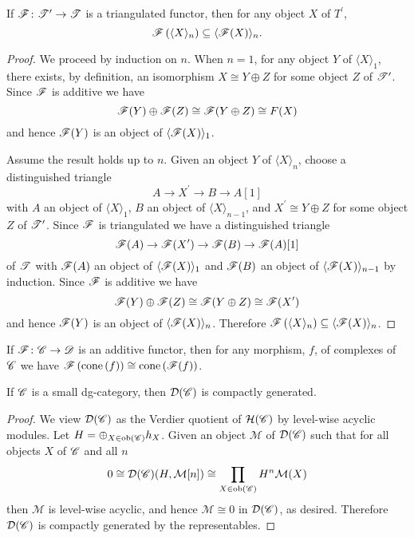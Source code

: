 \documentclass[dissertation.tex]{subfiles}
\begin{document}
\begin{lem}\label{TriangulatedFunctorsPreserveGens}
  If $\mathscr{F} \colon \mathscr{T}^\prime \to \mathscr{T}$ is a triangulated functor, then for any object $X$ of $T^\prime$, 
  $$\mathscr{F}\left(\langle X \rangle_n\right) \subseteq \langle \mathscr{F}(X) \rangle_n.$$

  \begin{proof}
    We proceed by induction on $n$.
    When $n = 1$, for any object $Y$ of $\langle X \rangle_1$, there exists, by definition, an isomorphism $X \cong Y \oplus Z$ for some object $Z$ of $\mathscr{T}^\prime$.
    Since $\mathscr{F}$ is additive we have
    $$\mathscr{F}(Y) \oplus \mathscr{F}(Z) \cong \mathscr{F}(Y \oplus Z) \cong F(X)$$
    and hence $\mathscr{F}(Y)$ is an object of $\langle \mathscr{F}(X) \rangle_1$.

    Assume the result holds up to $n$.
    Given an object $Y$ of $\langle X \rangle_n$, choose a distinguished triangle
    $$A \to X^\prime \to B \to A[1]$$
    with $A$ an object of $\langle X \rangle_1$, $B$ an object of $\langle X \rangle_{n-1}$, and $X^\prime \cong Y \oplus Z$ for some object $Z$ of $\mathscr{T}^\prime$.
    Since $\mathscr{F}$ is triangulated we have a distinguished triangle
    $$\mathscr{F}(A) \to \mathscr{F}(X^\prime) \to \mathscr{F}(B) \to \mathscr{F}(A)[1]$$
    of $\mathscr{T}$ with $\mathscr{F}(A)$ an object of $\langle \mathscr{F}(X) \rangle_1$ and $\mathscr{F}(B)$ an object of $\langle \mathscr{F}(X) \rangle_{n-1}$ by induction.
    Since $\mathscr{F}$ is additive we have
    $$\mathscr{F}(Y) \oplus \mathscr{F}(Z) \cong \mathscr{F}(Y \oplus Z) \cong \mathscr{F}(X^\prime)$$
    and hence $\mathscr{F}(Y)$ is an object of $\langle \mathscr{F}(X) \rangle_n$.
    Therefore $\mathscr{F}\left(\langle X \rangle_n\right) \subseteq \langle \mathscr{F}(X) \rangle_n$.
  \end{proof}
\end{lem}

\begin{lem}\label{AdditiveFunctorsCommuteWithCones}
  If $\mathscr{F} \colon \mathscr{C} \rightarrow \mathscr{D}$ is an additive functor, then for any morphism, $f$, of complexes of $\mathscr{C}$ we have
  $\mathscr{F}\left(\operatorname{cone}\left(f\right)\right) \cong \operatorname{cone}\left(\mathscr{F}(f)\right)$.
\end{lem}

\begin{lem}\label{RepresentablesGenerateSmallDG}
  If $\mathscr{C}$ is a small dg-category, then $\mathcal{D}(\mathscr{C})$ is compactly generated.

  \begin{proof}
    We view $\mathcal{D}(\mathscr{C})$ as the Verdier quotient of $\mathcal{H}(\mathscr{C})$ by level-wise acyclic modules.
    Let $H = \oplus_{X \in \operatorname{ob}\left(\mathscr{C}\right)} h_X$.
    Given an object $\mathcal{M}$ of $\mathcal{D}(\mathscr{C})$ such that for all objects $X$ of $\mathscr{C}$ and all $n$
    $$0 \cong \mathcal{D}(\mathscr{C})(H, \mathcal{M}[n]) \cong \prod_{X \in \operatorname{ob}\left(\mathscr{C}\right)} H^n\mathcal{M}(X)$$
    then $\mathcal{M}$ is level-wise acyclic, and hence $\mathcal{M} \cong 0$ in $\mathcal{D}(\mathscr{C})$, as desired.
    Therefore $\mathcal{D}(\mathscr{C})$ is compactly generated by the representables.
  \end{proof}
\end{lem}
\end{document}
